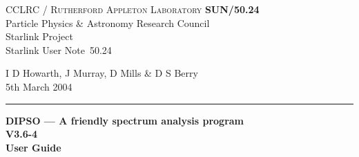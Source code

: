 \documentclass[twoside,11pt]{article}
\newcommand{\stardoccategory}  {Starlink User Note}
\newcommand{\stardocinitials}  {SUN}
\newcommand{\stardocnumber} {50.24}
\newcommand{\stardocauthors} {I D Howarth, J Murray, D Mills \& D S Berry}
\newcommand{\stardocdate} {5th March 2004}
\newcommand{\stardoctitle} {DIPSO --- A friendly spectrum analysis program}
\newcommand{\stardocversion}   {V3.6-4}
\newcommand{\stardocmanual}    {User Guide}
\newcommand{\stardocname}{\stardocinitials /\stardocnumber}
\newenvironment{latexonly}{}{}
\renewcommand{\_}{\texttt{\symbol{95}}}
\begin{document}
\thispagestyle{empty}

\begin{latexonly}
   CCLRC / \textsc{Rutherford Appleton Laboratory} \hfill \textbf{\stardocname}\\
   {\large Particle Physics \& Astronomy Research Council}\\
   {\large Starlink Project\\}
   {\large \stardoccategory\ \stardocnumber}
   \begin{flushright}
   \stardocauthors\\
   \stardocdate
   \end{flushright}
   \vspace{-4mm}
   \rule{\textwidth}{0.5mm}
   \vspace{5mm}
   \begin{center}
   {\Huge\textbf{\stardoctitle \\ [2.5ex]}}
   {\LARGE\textbf{\stardocversion \\ [4ex]}}
   {\Huge\textbf{\stardocmanual}}
   \end{center}
   \vspace{5mm}


\end{latexonly}
\end{document}
